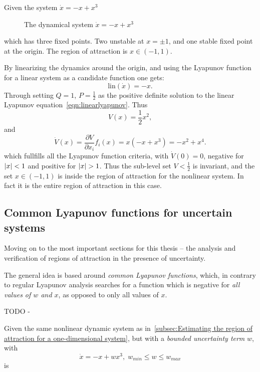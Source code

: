 Given the system \(\dot{x} = -x + x^3\)

\begin{figure}
  \centering 
  \caption{The dynamical system \(\dot{x} = -x + x^3\)}
\end{figure}
which has three fixed points. Two unstable at \(x = \pm 1\), and one stable
fixed point at the origin. The region of attraction is \(x \in \left( -1, 1
\right)\).

By linearizing the dynamics around the origin, and using the Lyapunov function
for a linear system as a candidate function one gets:
\[
  \text{lin}(\dot{x}) = -x.
\]
Through setting \(Q=1\), \(P=\frac{1}{2}\) as the positive definite solution to
the linear Lyapunov equation~\ref{eqn:linearlyapunov}. Thus
\[
  V(x) = \frac{1}{2}x^2,
\]
and
\[
  \dot{V}(x) = \frac{\partial V}{\partial x_i} f_i(x) = x(-x + x^3) = -x^2 +
  x^4.
\]
which fullfills all the Lyapunov function criteria, with \(\dot{V}(0) = 0\),
negative for \(\lvert x\rvert<1\) and positive for \(\lvert x\rvert > 1\). Thus the sub-level
set \(V < \frac{1}{2}\) is invariant, and the set \(x \in \left( -1, 1 \right)\)
is inside the region of attraction for the nonlinear system. In fact it is the
entire region of attraction in this case.

\subsection{Common Lyapunov functions for uncertain systems}

Moving on to the most important sections for this thesis -- the analysis and
verification of regions of attraction in the presence of uncertainty.

The general idea is based around \textit{common Lyapunov functions}, which, in
contrary to regular Lyapunov analysis searches for a function which is negative
for \textit{all values of \(w\) and \(x\)}, as opposed to only all values of
\(x\).

\begin{definition}
  TODO -
\end{definition}

\begin{example}
  Given the same nonlinear dynamic system as in~\ref{subsec:Estimating the
    region of attraction for a one-dimensional system}, but with a
  \textit{bounded uncertainty term} \(w\), with
  \[
    \dot{x} = -x + wx^3, \; w_{min} \leq w \leq w_{max}
  \]
  is

\end{example}

